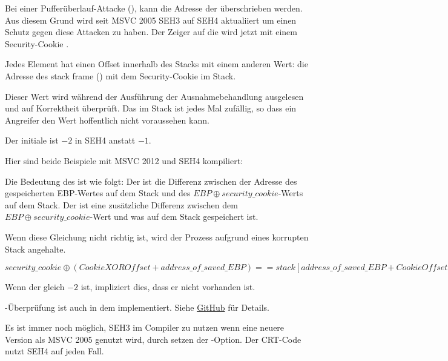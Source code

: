 
\myindex{\BufferOverflow}
Bei einer Pufferüberlauf-Attacke (), kann die Adresse der 
überschrieben werden. Aus diesem Grund wird seit MSVC 2005 SEH3 auf SEH4 aktualiiert um einen Schutz gegen
diese Attacken zu haben.
Der Zeiger auf die  wird jetzt mit einem Security-Cookie .

Jedes Element hat einen Offset innerhalb des Stacks mit einem anderen Wert:
die Adresse des \gls{stack frame} (\EBP)  mit dem Security-Cookie im Stack.

Dieser Wert wird während der Ausführung der Ausnahmebehandlung ausgelesen und auf
Korrektheit überprüft.
Das  im Stack ist jedes Mal zufällig, so dass ein Angreifer den
Wert hoffentlich nicht voraussehen kann.

Der initiale  ist $-2$ in SEH4 anstatt $-1$.

\def\SEHfour{1}


Hier sind beide Beispiele mit MSVC 2012 und SEH4 kompiliert:





Die Bedeutung des  ist wie folgt:
Der  ist die Differenz zwischen der Adresse des gespeicherten EBP-Wertes
auf dem Stack und des $EBP \oplus security\_cookie$-Werts auf dem Stack.
Der   ist eine zusätzliche Differenz zwischen dem $EBP \oplus security\_cookie$-Wert
und was auf dem Stack gespeichert ist.

Wenn diese Gleichung nicht richtig ist, wird der Prozess aufgrund eines korrupten Stack angehalte.

\begin{center}
$security\_cookie \oplus (CookieXOROffset + address\_of\_saved\_EBP) == stack[address\_of\_saved\_EBP + CookieOffset]$
\end{center}

Wenn der  gleich $-2$ ist, impliziert dies, dass er nicht vorhanden ist.

-Überprüfung ist auch in dem \tracer{} implementiert.
Siehe \href{http://go.yurichev.com/17061}{GitHub} für Details.

Es ist immer noch möglich, SEH3 im Compiler zu nutzen wenn eine neuere Version als MSVC 2005
genutzt wird, durch setzen der -Option.
Der \ac{CRT}-Code nutzt SEH4 auf jeden Fall.
